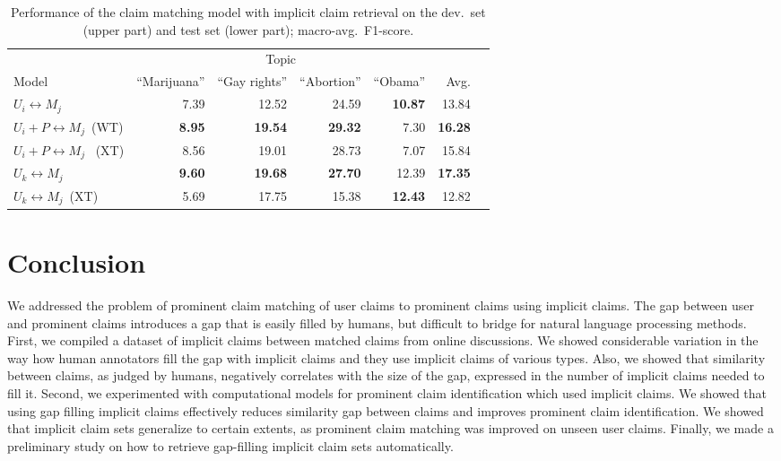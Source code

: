 \begin{table}
\begin{center}
{\small
\setlength{\tabcolsep}{4.8pt}
\begin{tabular}{lrrrrrr}
\toprule
&\multicolumn{4}{c}{Topic}\\
\cmidrule(lr){2-5}
Model & ``Marijuana'' & ``Gay rights''  & ``Abortion'' & ``Obama'' & Avg. \\
\midrule
$U_i \leftrightarrow M_j$ & 7.39          & 12.52        & 24.59       & {\bf 10.87} & 13.84 \\
$U_i + P \leftrightarrow M_j$\ (WT)     & {\bf 8.95}    & {\bf 19.54}  & {\bf 29.32} & 7.30        & {\bf 16.28} \\
$U_i + P \leftrightarrow M_j$ \ (XT)   & 8.56          & 19.01        & 28.73       & 7.07        & 15.84 \\
\midrule
$U_k \leftrightarrow M_j$            & {\bf 9.60}   & {\bf 19.68}   & {\bf 27.70} & 12.39       & {\bf 17.35} \\
$U_k \leftrightarrow M_j$\ (XT)  & 5.69         &  17.75        & 15.38       & {\bf 12.43} & 12.82 \\
\bottomrule
\end{tabular}}
\caption{Performance of the claim matching model with implicit claim retrieval on the
dev.~set (upper part) and test set (lower part); macro-avg.~F1-score.}
\label{tab:argpremise_retrieval}
\end{center}
\end{table}

\section{Conclusion}

We addressed the problem of prominent claim matching of user claims to prominent claims
using implicit claims.
The gap between user and prominent claims introduces a gap that is 
easily filled by humans, but difficult to bridge for natural language processing 
methods. 
First, we compiled a dataset of implicit claims between matched claims from 
online discussions.
We showed considerable variation in the way how human annotators fill the gap
with implicit claims and they use implicit claims of various types. 
Also, we showed that similarity between claims, as judged by humans, negatively
correlates with the size of the gap, 
expressed in the number of implicit claims needed to fill it. 
Second, we experimented with computational models for prominent claim identification 
which used implicit claims. 
We showed that using gap filling implicit claims effectively reduces similarity gap between claims 
and improves prominent claim identification. 
We showed that implicit claim sets generalize to certain extents, as prominent claim matching was
improved on unseen user claims. 
Finally, we made a preliminary study on how to retrieve gap-filling implicit
claim sets automatically.

